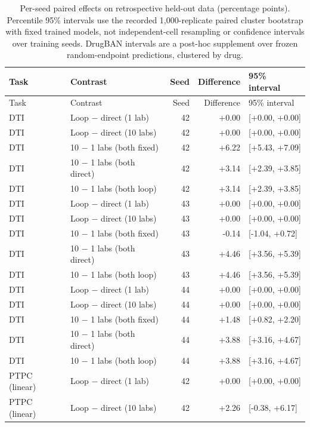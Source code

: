 \begin{longtable}{llrrl}
\caption{Per-seed paired effects on retrospective held-out data (percentage points). Percentile 95\% intervals use the recorded 1,000-replicate paired cluster bootstrap with fixed trained models, not independent-cell resampling or confidence intervals over training seeds. DrugBAN intervals are a post-hoc supplement over frozen random-endpoint predictions, clustered by drug.}\label{tab:unified-heldout-uncertainty}\\
\toprule Task & Contrast & Seed & Difference & 95\% interval \\ \midrule\endfirsthead
\toprule Task & Contrast & Seed & Difference & 95\% interval \\ \midrule\endhead
DTI & Loop $-$ direct (1 lab) & 42 & +0.00 & [+0.00, +0.00] \\
DTI & Loop $-$ direct (10 labs) & 42 & +0.00 & [+0.00, +0.00] \\
DTI & 10 $-$ 1 labs (both fixed) & 42 & +6.22 & [+5.43, +7.09] \\
DTI & 10 $-$ 1 labs (both direct) & 42 & +3.14 & [+2.39, +3.85] \\
DTI & 10 $-$ 1 labs (both loop) & 42 & +3.14 & [+2.39, +3.85] \\
\midrule
DTI & Loop $-$ direct (1 lab) & 43 & +0.00 & [+0.00, +0.00] \\
DTI & Loop $-$ direct (10 labs) & 43 & +0.00 & [+0.00, +0.00] \\
DTI & 10 $-$ 1 labs (both fixed) & 43 & -0.14 & [-1.04, +0.72] \\
DTI & 10 $-$ 1 labs (both direct) & 43 & +4.46 & [+3.56, +5.39] \\
DTI & 10 $-$ 1 labs (both loop) & 43 & +4.46 & [+3.56, +5.39] \\
\midrule
DTI & Loop $-$ direct (1 lab) & 44 & +0.00 & [+0.00, +0.00] \\
DTI & Loop $-$ direct (10 labs) & 44 & +0.00 & [+0.00, +0.00] \\
DTI & 10 $-$ 1 labs (both fixed) & 44 & +1.48 & [+0.82, +2.20] \\
DTI & 10 $-$ 1 labs (both direct) & 44 & +3.88 & [+3.16, +4.67] \\
DTI & 10 $-$ 1 labs (both loop) & 44 & +3.88 & [+3.16, +4.67] \\
\midrule
PTPC (linear) & Loop $-$ direct (1 lab) & 42 & +0.00 & [+0.00, +0.00] \\
PTPC (linear) & Loop $-$ direct (10 labs) & 42 & +2.26 & [-0.38, +6.17] \\

\end{longtable}

